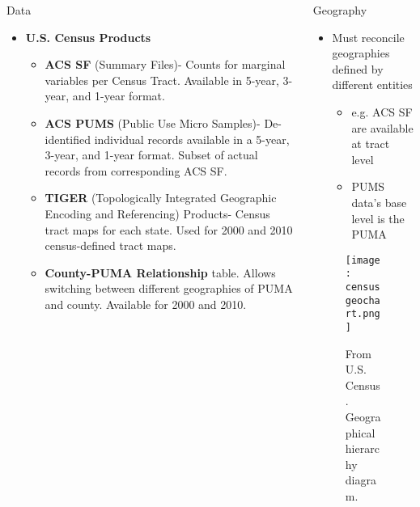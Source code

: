 \documentclass[final]{beamer}
\newlength{\onecolwid}
\newlength{\twocolwid}
\begin{document}
\begin{frame}[t]
\begin{columns}[t]
\begin{column}{\twocolwid}
\begin{columns}[t,totalwidth=\twocolwid]
\begin{column}{\onecolwid}
\begin{block}{Data}
\begin{itemize}
\item \textbf{U.S. Census Products}
\begin{itemize}
\item \textbf{ACS SF} (Summary Files)- Counts for marginal variables per Census Tract.  Available in 5-year, 3-year, and 1-year format.
\item \textbf{ACS PUMS} (Public Use Micro Samples)- De-identified individual records available in a 5-year, 3-year, and 1-year format.  Subset of actual records from corresponding ACS SF.
\item \textbf{TIGER} (Topologically Integrated Geographic Encoding and Referencing) Products- Census tract maps for each state.  Used for 2000 and 2010 census-defined tract maps.
\item \textbf{County-PUMA Relationship} table.  Allows switching between different geographies of PUMA and county.  Available for 2000 and 2010.
\end{itemize}
\end{itemize}

\end{block}


\end{column} %

\begin{column}{\onecolwid}\vspace{-.6in} %


\begin{block}{Geography}
\begin{itemize}
\item Must reconcile geographies defined by different entities
\begin{itemize}
\item e.g. ACS SF are available at tract level
\item PUMS data's base level is the PUMA
\end{itemize}
\end{itemize}
\begin{figure}\label{geohier}
\texttt{[image: censusgeochart.png]}
\caption{From U.S. Census.  Geographical hierarchy diagram.}
\end{figure}


\end{block}
\end{column}
\end{columns}
\end{column}
\end{columns}
\end{frame}
\end{document}
